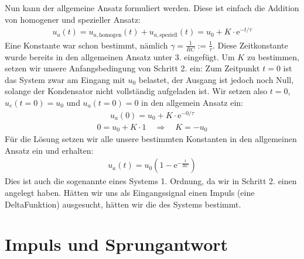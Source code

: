 \documentclass[letterpaper,10pt,english]{jupyterBook}
\begin{document}
\sphinxAtStartPar
{}
Nun kann der allgemeine Ansatz formuliert werden. Diese ist einfach die Addition von homogener und spezieller Ansatz:
\begin{equation*}
\begin{split}u_a(t) = u_{a,\mathrm{homogen}}(t) + u_{a,\mathrm{speziell}}(t) = u_0 + K \cdot \mathrm e^{-t/\tau}\end{split}
\end{equation*}
\sphinxAtStartPar
{}
Eine Konstante war schon bestimmt, nämlich \(\gamma = \frac{1}{RC} := \frac{1}{\tau}\). Diese Zeitkonstante wurde bereits in den allgemeinen Ansatz unter 3. eingefügt. Um \(K\) zu bestimmen, setzen wir unsere Anfangsbedingung von Schritt 2. ein: Zum Zeitpunkt \(t=0\) ist das System zwar am Eingang mit \(u_0\) belastet, der Ausgang ist jedoch noch Null, solange der Kondensator nicht vollständig aufgeladen ist. Wir setzen also \(t=0\), \(u_e(t=0) = u_0\) und \(u_a(t = 0) = 0\) in den allgemein Ansatz ein:
\begin{equation*}
\begin{split}u_a(0) = u_0 + K \cdot \mathrm e^{-0/\tau}\end{split}
\end{equation*}\begin{equation*}
\begin{split}0 = u_0 + K \cdot 1 \quad \Rightarrow \quad K = -u_0\end{split}
\end{equation*}
\sphinxAtStartPar
{}
Für die Lösung setzen wir alle unsere bestimmten Konstanten in den allgemeinen Ansatz ein und erhalten:
\begin{equation*}
\begin{split}u_a(t) = u_0 \left(1- \mathrm e^{-\frac{t}{RC}}\right)\end{split}
\end{equation*}
\sphinxAtStartPar
Dies ist auch die sogenannte  eines Systems 1. Ordnung, da wir in Schritt 2. einen  angelegt haben. Hätten wir uns als Eingangssignal einen Impuls (eine Delta\sphinxhyphen{}Funktion) ausgesucht, hätten wir die  des Systems bestimmt.

\sphinxAtStartPar
{}

\sphinxstepscope


\section{Impuls\sphinxhyphen{} und Sprungantwort}
\label{\detokenize{content/5_ImpulsSprung:impuls-und-sprungantwort}}\label{\detokenize{content/5_ImpulsSprung::doc}}
\sphinxAtStartPar
\end{document}
